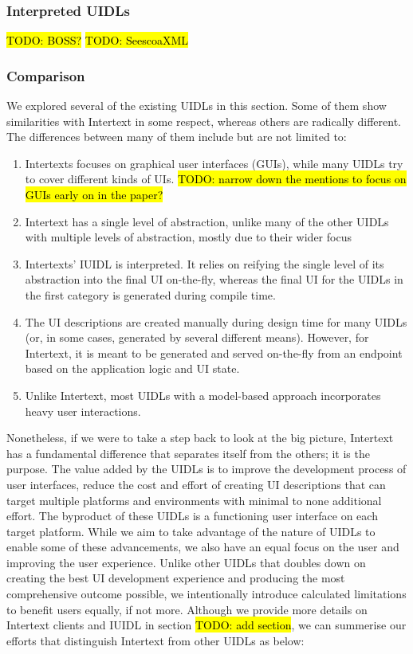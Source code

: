 \subsubsection{Interpreted UIDLs}

\hl{TODO: BOSS?}
\hl{TODO: SeescoaXML}

\subsubsection{Comparison}

We explored several of the existing UIDLs in this section. Some of them show similarities with Intertext in some respect, whereas others are radically different. The differences between many of them include but are not limited to:

\begin{enumerate}
  \item Intertexts focuses on graphical user interfaces (GUIs), while many UIDLs try to cover different kinds of UIs. \hl{TODO: narrow down the mentions to focus on GUIs early on in the paper?}
  \item Intertext has a single level of abstraction, unlike many of the other UIDLs with multiple levels of abstraction, mostly due to their wider focus
  \item Intertexts' IUIDL is interpreted. It relies on reifying the single level of its abstraction into the final UI on-the-fly, whereas the final UI for the UIDLs in the first category is generated during compile time.
  \item The UI descriptions are created manually during design time for many UIDLs (or, in some cases, generated by several different means). However, for Intertext, it is meant to be generated and served on-the-fly from an endpoint based on the application logic and UI state.
  \item Unlike Intertext, most UIDLs with a model-based approach incorporates heavy user interactions.
\end{enumerate}

Nonetheless, if we were to take a step back to look at the big picture, Intertext has a fundamental difference that separates itself from the others; it is the purpose. The value added by the UIDLs is to improve the development process of user interfaces, reduce the cost and effort of creating UI descriptions that can target multiple platforms and environments with minimal to none additional effort. The byproduct of these UIDLs is a functioning user interface on each target platform. While we aim to take advantage of the nature of UIDLs to enable some of these advancements, we also have an equal focus on the user and improving the user experience. Unlike other UIDLs that doubles down on creating the best UI development experience and producing the most comprehensive outcome possible, we intentionally introduce calculated limitations to benefit users equally, if not more. Although we provide more details on Intertext clients and IUIDL in section \hl{TODO: add section}, we can summerise our efforts that distinguish Intertext from other UIDLs as below:

